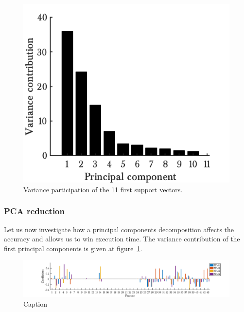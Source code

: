 \begin{figure}
\begin{center}
    \includegraphics[width=.45\textwidth]{parts/chap-4/img-svm/pca-var.png}
    \caption{Variance participation of the 11 first support vectors.}
    \label{fig:pca-var}
\end{center}
\end{figure}

\subsubsection{PCA reduction}
Let us now investigate how a principal components decomposition affects the accuracy and allows us to win execution time. The variance contribution of the first principal components is given at figure~\ref{fig:pca-var}.

\begin{figure}
    \centering
    \includegraphics[width=1.\textwidth]{parts/chap-4/img-svm/pca-features.png}
    \caption{Caption}
    \label{fig:pca-features}
\end{figure}

